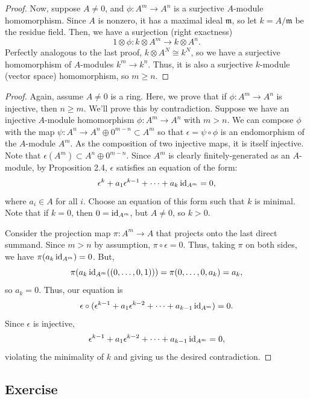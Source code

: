 \begin{proof}
Now, suppose $A \neq 0$, and $\phi : A^m \to A^n$ is a surjective $A$-module homomorphism. Since $A$ is nonzero, it has a maximal ideal $\mathfrak{m}$, so let $k = A/\mathfrak{m}$ be the
residue field. Then, we have a surjection (right exactness)
$$1 \otimes \phi : k \otimes A^m \to k \otimes A^n.$$
Perfectly analogous to the last proof, $k \otimes A^N \cong k^N$, so we have a surjective homomorphism of $A$-modules $k^m \to k^n$. Thus, it is also a surjective $k$-module (vector space) homomorphism,
so $m \ge n$.
\end{proof}

\begin{proof}
Again, assume $A \neq 0$ is a ring. Here, we prove that if $\phi : A^m \to A^n$ is injective, then $n \ge m$. We'll prove this by contradiction. Suppose we have an injective $A$-module homomorphism $\phi: A^m \to A^n$ with $m > n$. We can
compose $\phi$ with the map $\psi: A^n \to A^n \oplus 0^{m-n} \subset A^m$ so that $\epsilon = \psi \circ \phi$ is an endomorphism of the $A$-module $A^m$. As the composition of two injective maps, it is itself injective.
Note that $\epsilon(A^m) \subset A^n \oplus 0^{m-n}$. 
Since $A^m$ is clearly finitely-generated as an $A$-module, by Proposition 2.4, $\epsilon$ satisfies an equation of the form:
$$\epsilon^k + a_1 \epsilon^{k-1} + \dots + a_k \operatorname{id}_{A^m} = 0,$$
where $a_i \in A$ for all $i$. Choose an equation of this form such that $k$ is minimal. Note that if $k = 0$, then $0 = \operatorname{id}_{A^m}$, but $A \neq 0$, so $k > 0$.

Consider the projection map $\pi : A^m \to A$ that projects onto the last direct summand. Since $m > n$ by assumption, $\pi \circ \epsilon = 0$. Thus, taking $\pi$ on both sides, 
we have $\pi(a_k \operatorname{id}_{A^m}) = 0$. But, 
$$\pi(a_k \operatorname{id}_{A^m}((0,\ldots,0,1))) = \pi(0,\ldots,0,a_k) = a_k,$$ 
so $a_k = 0$. Thus, our equation is
$$\epsilon \circ (\epsilon^{k-1} + a_1 \epsilon^{k-2} + \dots + a_{k-1} \operatorname{id}_{A^m}) = 0.$$
Since $\epsilon$ is injective,
$$\epsilon^{k-1} + a_1 \epsilon^{k-2} + \dots + a_{k-1} \operatorname{id}_{A^m} = 0,$$
violating the minimality of $k$ and giving us the desired contradiction.
\end{proof}

\subsection{Exercise}\label{2.12} %

